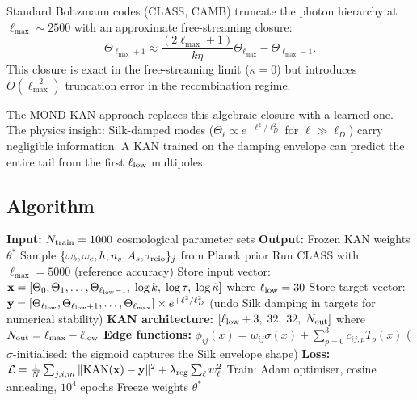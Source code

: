 \documentclass[11pt]{article}
\theoremstyle{definition}
\theoremstyle{remark}
\begin{document}
Standard Boltzmann codes (CLASS, CAMB) truncate the photon hierarchy at
$\ell_{\max} \sim 2500$ with an approximate free-streaming closure:
\begin{equation}
  \Theta_{\ell_{\max}+1} \approx
  \frac{(2\ell_{\max}+1)}{k\eta}\Theta_{\ell_{\max}}
  - \Theta_{\ell_{\max}-1}.
  \label{eq:standard-closure}
\end{equation}
This closure is exact in the free-streaming limit ($\dot\kappa = 0$)
but introduces $O(\ell_{\max}^{-2})$ truncation error in the
recombination regime.

The MOND-KAN approach replaces this algebraic closure with a learned
one. The physics insight: Silk-damped modes
($\Theta_\ell \propto e^{-\ell^2/\ell_D^2}$ for $\ell \gg \ell_D$)
carry negligible information. A KAN trained on the damping envelope
can predict the entire tail from the first $\ell_{\rm low}$ multipoles.

\subsection{Algorithm}

\begin{algorithm}[H]
\caption{MOND-KAN Boltzmann Closure: Offline Training}
\label{alg:kan-train}
\begin{algorithmic}[1]
\State \textbf{Input:} $N_{\rm train} = 1000$ cosmological parameter sets
\State \textbf{Output:} Frozen KAN weights $\theta^*$
\Statex
{}
  \State Sample $\{\omega_b, \omega_c, h, n_s, A_s, \tau_{\rm reio}\}_j$
    from Planck prior
  \State Run CLASS with $\ell_{\max} = 5000$ (reference accuracy)
    \State Store input vector:
    \Statex \quad $\mathbf{x} = [\Theta_0, \Theta_1, \ldots, \Theta_{\ell_{\rm low}-1},
      \;\log k, \;\log\tau, \;\log\dot\kappa]$
    \Statex \quad where $\ell_{\rm low} = 30$
    \State Store target vector:
    \Statex \quad $\mathbf{y} = [\Theta_{\ell_{\rm low}}, \Theta_{\ell_{\rm low}+1},
      \ldots, \Theta_{\ell_{\max}}]
      \times e^{+\ell^2/\ell_D^2}$
    \Statex \quad (undo Silk damping in targets for numerical stability)
  \EndFor
\EndFor
\Statex
\State \textbf{KAN architecture:} $[\ell_{\rm low}+3,\; 32,\; 32,\; N_{\rm out}]$
\Statex where $N_{\rm out} = \ell_{\max} - \ell_{\rm low}$
\State \textbf{Edge functions:} $\phi_{ij}(x) = w_{ij}\sigma(x)
  + \sum_{p=0}^{3} c_{ij,p} T_p(x)$
\Statex ($\sigma$-initialised: the sigmoid captures the Silk envelope shape)
\Statex
\State \textbf{Loss:} $\mathcal{L} = \frac{1}{N}\sum_{j,i,m}
  \|\text{KAN}(\mathbf{x}) - \mathbf{y}\|^2
  + \lambda_{\rm reg}\sum_{\ell} w_\ell^2$
\State Train: Adam optimiser, cosine annealing, $10^4$ epochs
\State Freeze weights $\theta^*$
\end{algorithmic}
\end{algorithm}
\end{document}
